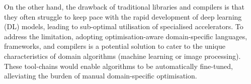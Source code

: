 On the other hand, the drawback of traditional libraries and compilers is that they often struggle to keep pace with the rapid development of deep learning (DL) models, leading to sub-optimal utilisation of specialised accelerators. 
To address the limitation, adopting optimisation-aware domain-specific languages, frameworks, and compilers is a potential solution to cater to the unique characteristics of domain algorithms (\eg machine learning or image processing). These tool-chains would enable algorithms to be automatically fine-tuned, alleviating the burden of manual domain-specific optimisation.










 